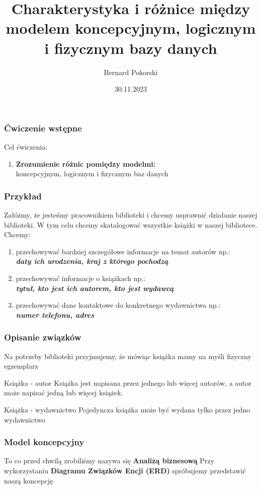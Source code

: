 \documentclass{beamer}
\title{Charakterystyka i różnice między modelem koncepcyjnym, logicznym i fizycznym bazy danych}
\author{Bernard Pokorski}
\date{30.11.2023}
\begin{document}
\begin{frame}
\titlepage %
\end{frame}

\begin{frame}
\frametitle{Ćwiczenie wstępne}
Cel ćwiczenia:
\begin{enumerate}
    \item \textbf{Zrozumienie różnic pomiędzy modelmi:} \\ koncepcyjnym, logicznym i fizycznym baz danych
\end{enumerate}
\end{frame}

\begin{frame}
    \frametitle{Przykład}
    Załóżmy, że jesteśmy pracownikiem biblioteki i chcemy usprawnić działanie naszej biblioteki.
    W tym celu chcemy skatalogować wszystkie książki w naszej bibliotece.
    Chcemy: 
    \begin{enumerate}
    \item przechowywać bardziej szczegółowe informacje na temat autorów np.: \\ \textbf{\textit{daty ich urodzenia, kraj z którego pochodzą}}
    \item przechowywać informacje o książkach np.:\\ \textbf{\textit{tytuł, kto jest ich autorem, kto jest wydawcą}}
    \item przechowywać dane kontaktowe do konkretnego wydawnictwa np.:\\ \textbf{\textit{numer telefonu, adres}}
\end{enumerate}
\end{frame}

\begin{frame}
    \frametitle{Opisanie związków}
    Na potrzeby biblioteki przyjmujemy, że mówiąc książka mamy na myśli fizyczny egzemplarz
    \begin{block}{Książka - autor}
        Książka jest napisana przez jednego lub więcej autorów, a autor może napisać jedną lub więcej książek.
    \end{block}
    \begin{block}{Książka - wydawnictwo}
        Pojedyncza książka może być wydana tylko przez jedno wydawnictwo 
    \end{block}
\end{frame}

\begin{frame}
    \frametitle{Model koncepcyjny}
   To co przed chwilą zrobiliśmy nazywa się \textbf{Analizą biznesową}
   Przy wykorzystaniu \textbf{Diagramu Związków Encji (ERD)} spróbujemy przedstawić naszą koncepcję 
\end{frame}
\end{document}

